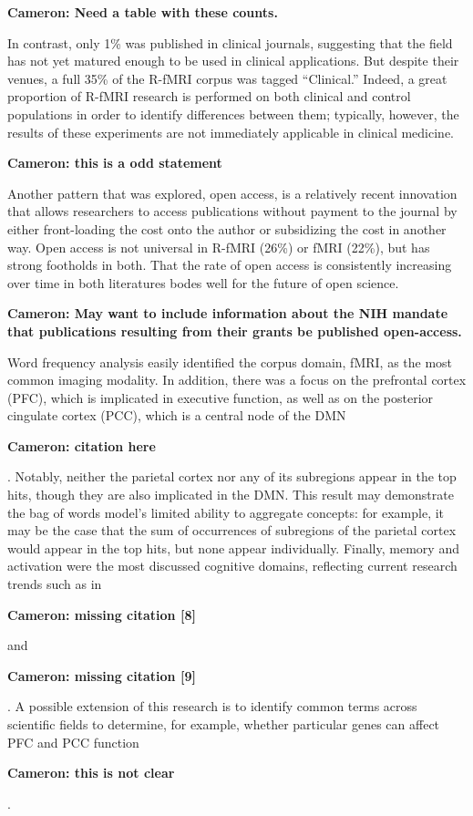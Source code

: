 \documentclass[5p]{elsarticle}
\newcommand\MyCBox[1]{%
  \colorbox{yellow!60}{\begin{varwidth}{\dimexpr\linewidth-2\fboxsep}#1\end{varwidth}}}
\newcommand{\COMMENTCC}[1]{\MyCBox{\textcolor{cc_commentcolor}{\textbf{Cameron:
#1}}}}
\begin{document}
\COMMENTCC{Need a table with these counts.}

In contrast, only 1\% was published in clinical journals, suggesting that
the field has not yet matured enough to be used in clinical applications.
But despite their venues, a full 35\% of the R-fMRI corpus was tagged
“Clinical.” Indeed, a great proportion of R-fMRI research is performed on
both clinical and control populations in order to identify differences
between them; typically, however, the results of these experiments are not
immediately applicable in clinical medicine. \COMMENTCC{this is a odd
statement}

Another pattern that was explored, open access, is a relatively recent
innovation that allows researchers to access publications without payment
to the journal by either front-loading the cost onto the author or
subsidizing the cost in another way. Open access is not universal in
R-fMRI (26\%) or fMRI (22\%), but has strong footholds in both. That the
rate of open access is consistently increasing over time in both
literatures bodes well for the future of open science. \COMMENTCC{May want
to include information about the NIH mandate that publications resulting
from their grants be published open-access.}

Word frequency analysis easily identified the corpus domain, fMRI, as the
most common imaging modality. In addition, there was a focus on the
prefrontal cortex (PFC), which is implicated in executive function, as
well as on the posterior cingulate cortex (PCC), which is a central node
of the DMN \COMMENTCC{citation here}.  Notably, neither the parietal
cortex nor any of its subregions appear in the top hits, though they are
also implicated in the DMN. This result may demonstrate the bag of words
model’s limited ability to aggregate concepts: for example, it may be the
case that the sum of occurrences of subregions of the parietal cortex
would appear in the top hits, but none appear individually. Finally,
memory and activation were the most discussed cognitive domains,
reflecting current research trends such as in \COMMENTCC{missing citation
[8]} and \COMMENTCC{missing citation [9]}. A possible extension of this
research is to identify common terms across scientific fields to
determine, for example, whether particular genes can affect PFC and PCC
function \COMMENTCC{this is not clear}.
\end{document}
